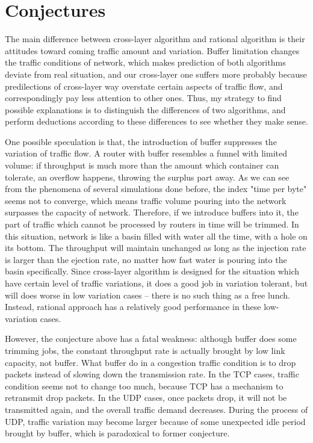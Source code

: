 \documentclass[a4paper]{article}
\begin{document}
\section{Conjectures}
\label{sec:conjecture}

The main difference between cross-layer algorithm and rational algorithm is their attitudes toward coming traffic amount and variation. Buffer limitation changes the traffic conditions of network, which makes prediction of both algorithms deviate from real situation, and our cross-layer one suffers more probably because predilections of cross-layer way overstate certain aspects of traffic flow, and correspondingly pay less attention to other ones. Thus, my strategy to find possible explanations is to distinguish the differences of two algorithms, and perform deductions according to these differences to see whether they make sense.
	
One possible speculation is that, the introduction of buffer suppresses the variation of  traffic flow. A router with buffer resembles a funnel with limited volume: if throughput is much more than the amount which container can tolerate, an overflow happens, throwing the surplus part away. As we can see from the phenomena of several simulations done before, the index "time per byte" seems not to converge, which means traffic volume pouring into the network surpasses the capacity of network. Therefore, if we introduce buffers into it, the part of traffic which cannot be processed by routers in time will be trimmed. In this situation, network is like a basin filled with water all the time, with a hole on its bottom. The throughput will maintain unchanged as long as the injection rate is larger than the ejection rate, no matter how fast water is pouring into the basin specifically. Since cross-layer algorithm is designed for the situation which have certain level of traffic variations, it does a good job in variation tolerant, but will does worse in low variation cases -- there is no such thing as a free lunch. Instead, rational approach has a relatively good performance in these low-variation cases.
	
However, the conjecture above has a fatal weakness: although buffer does some trimming jobs, the constant throughput rate is actually brought by low link capacity, not buffer. What buffer do in a congestion traffic condition is to drop packets instead of slowing down the transmission rate. In the TCP cases, traffic condition seems not to change too much, because TCP has a mechanism to retransmit drop packets. In the UDP cases, once packets drop, it will not be transmitted again, and the overall traffic demand decreases. During the process of UDP, traffic variation may become larger because of some unexpected idle period brought by buffer, which is paradoxical to former conjecture.
	
\end{document}
